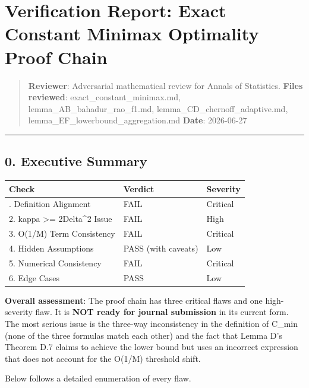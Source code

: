 \documentclass[
  12pt,
]{ctexart}
\author{SCX}
\date{2026}
\begin{document}
\section{Verification Report: Exact Constant Minimax Optimality Proof
Chain}\label{verification-report-exact-constant-minimax-optimality-proof-chain}

\begin{quote}
\textbf{Reviewer}: Adversarial mathematical review for Annals of
Statistics. \textbf{Files reviewed}: exact\_constant\_minimax.md,
lemma\_AB\_bahadur\_rao\_f1.md, lemma\_CD\_chernoff\_adaptive.md,
lemma\_EF\_lowerbound\_aggregation.md \textbf{Date}: 2026-06-27
\end{quote}

\begin{center}\rule{0.5\linewidth}{0.5pt}\end{center}

\subsection{0. Executive Summary}\label{executive-summary}

\begin{longtable}[]{@{}lll@{}}
\toprule\noalign{}
Check & Verdict & Severity \\
\midrule\noalign{}
\endhead
\bottomrule\noalign{}
\endlastfoot
1. Definition Alignment & FAIL & Critical \\
2. kappa \textgreater= 2Delta\^{}2 Issue & FAIL & High \\
3. O(1/M) Term Consistency & FAIL & Critical \\
4. Hidden Assumptions & PASS (with caveats) & Low \\
5. Numerical Consistency & FAIL & Critical \\
6. Edge Cases & PASS & Low \\
\end{longtable}

\textbf{Overall assessment}: The proof chain has three critical flaws
and one high-severity flaw. It is \textbf{NOT ready for journal
submission} in its current form. The most serious issue is the three-way
inconsistency in the definition of C\_min (none of the three formulas
match each other) and the fact that Lemma D's Theorem D.7 claims to
achieve the lower bound but uses an incorrect expression that does not
account for the O(1/M) threshold shift.

Below follows a detailed enumeration of every flaw.
\end{document}
